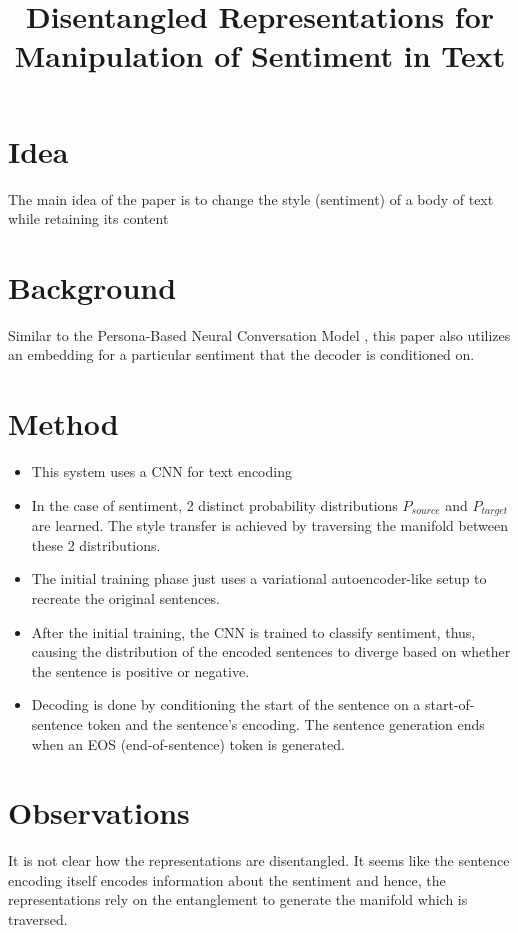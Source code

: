 \documentclass[12pt]{article}
\begin{document}
\title{Disentangled Representations for Manipulation of Sentiment in Text}
\author{}
\date{}
\maketitle

\section{Idea}
  The main idea of the paper is to change the style (sentiment) of a body of text while retaining its content

\section{Background}
  Similar to the Persona-Based Neural Conversation Model \cite{li2016persona}, this paper also utilizes an embedding for a particular sentiment that the decoder is conditioned on.

\section{Method}
  \begin{itemize}
    \item This system uses a CNN for text encoding
    \item In the case of sentiment, 2 distinct probability distributions $P_{source}$ and $P_{target}$ are learned. The style transfer is achieved by traversing the manifold between these 2 distributions.
    \item The initial training phase just uses a variational autoencoder-like setup to recreate the original sentences.
    \item After the initial training, the CNN is trained to classify sentiment, thus, causing the distribution of the encoded sentences to diverge based on whether the sentence is positive or negative.
    \item Decoding is done by conditioning the start of the sentence on a start-of-sentence token and the sentence's encoding. The sentence generation ends when an EOS (end-of-sentence) token is generated.
  \end{itemize}

\section{Observations}
  It is not clear how the representations are disentangled. It seems like the sentence encoding itself encodes information about the sentiment and hence, the representations rely on the entanglement to generate the manifold which is traversed.



\end{document}
